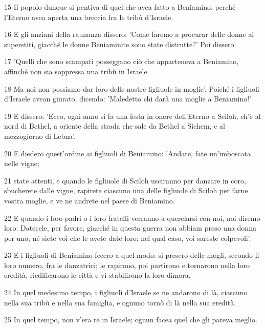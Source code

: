 \par 15 Il popolo dunque si pentiva di quel che avea fatto a Beniamino, perché l'Eterno avea aperta una breccia fra le tribù d'Israele.
\par 16 E gli anziani della raunanza dissero: 'Come faremo a procurar delle donne ai superstiti, giacché le donne Beniaminite sono state distrutte?' Poi dissero:
\par 17 'Quelli che sono scampati posseggano ciò che apparteneva a Beniamino, affinché non sia soppressa una tribù in Israele.
\par 18 Ma noi non possiamo dar loro delle nostre figliuole in moglie'. Poiché i figliuoli d'Israele avean giurato, dicendo: 'Maledetto chi darà una moglie a Beniamino!'
\par 19 E dissero: 'Ecco, ogni anno si fa una festa in onore dell'Eterno a Sciloh, ch'è al nord di Bethel, a oriente della strada che sale da Bethel a Sichem, e al mezzogiorno di Lebna'.
\par 20 E diedero quest'ordine ai figliuoli di Beniamino: 'Andate, fate un'imboscata nelle vigne;
\par 21 state attenti, e quando le figliuole di Sciloh usciranno per danzare in coro, sbucherete dalle vigne, rapirete ciascuno una delle figliuole di Sciloh per farne vostra moglie, e ve ne andrete nel paese di Beniamino.
\par 22 E quando i loro padri o i loro fratelli verranno a querelarsi con noi, noi diremo loro: Datecele, per favore, giacché in questa guerra non abbiam preso una donna per uno; né siete voi che le avete date loro; nel qual caso, voi sareste colpevoli'.
\par 23 E i figliuoli di Beniamino fecero a quel modo: si presero delle mogli, secondo il loro numero, fra le danzatrici; le rapirono, poi partirono e tornarono nella loro eredità, riedificarono le città e vi stabilirono la loro dimora.
\par 24 In quel medesimo tempo, i figliuoli d'Israele se ne andarono di là, ciascuno nella sua tribù e nella sua famiglia, e ognuno tornò di là nella sua eredità.
\par 25 In quel tempo, non v'era re in Israele; ognun facea quel che gli pareva meglio.


